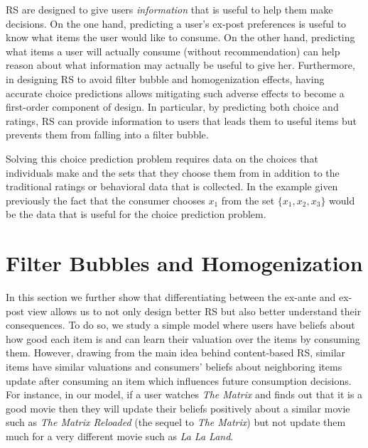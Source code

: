 \documentclass[sigconf]{acmart}
\begin{document}
\par
RS are designed to give users \textit{information} that is useful to help them make decisions. On the one hand, predicting a user's ex-post preferences is useful to know what items the user would like to consume. On the other hand, predicting what items a user will actually consume (without recommendation) can help reason about what information may actually be useful to give her. Furthermore, in designing RS to avoid filter bubble and homogenization effects, having accurate choice predictions allows mitigating such adverse effects to become a first-order component of design. In particular, by predicting both choice and ratings, RS can provide information to users that leads them to useful items but prevents them from falling into a filter bubble. 
\par
Solving this choice prediction problem requires data on the choices that individuals make and the sets that they choose them from in addition to the traditional ratings or behavioral data that is collected. In the example given previously the fact that the consumer chooses $x_1$ from the set $\{x_1, x_2, x_3 \}$ would be the data that is useful for the choice prediction problem.
\section{Filter Bubbles and Homogenization}\label{sec:consumer_learning}
In this section we further show that differentiating between the ex-ante and ex-post view allows us to not only design better RS but also better understand their consequences. To do so, we study a simple model where users have beliefs about how good each item is and can learn their valuation over the items by consuming them. However, drawing from the main idea behind content-based RS, similar items have similar valuations and consumers' beliefs about neighboring items update after consuming an item which influences future consumption decisions. For instance, in our model, if a user watches \textit{The Matrix} and finds out that it is a good movie then they will update their beliefs positively about a similar movie such as \textit{The Matrix Reloaded} (the sequel to \textit{The Matrix}) but not update them much for a very different movie such as \textit{La La Land}.
\end{document}

